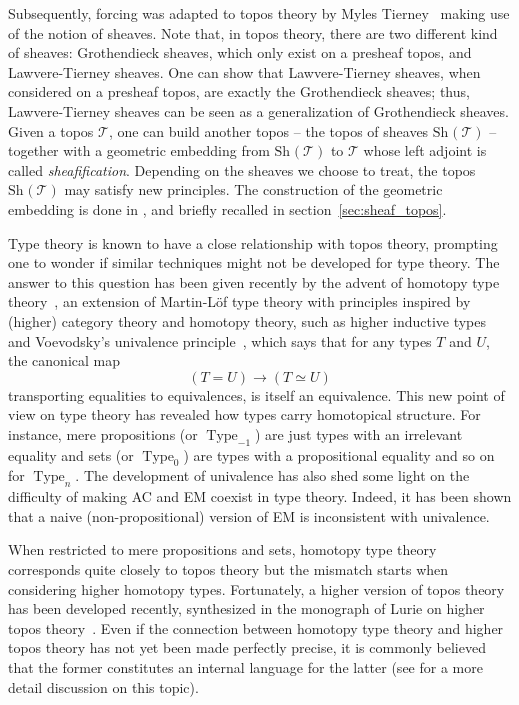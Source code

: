 \documentclass[notfinal]{jfrarticle}
\DeclareMathOperator{\Type}{Type}
\newcommand \Sh[1] {\mathrm{Sh}_{#1}}
\begin{document}
Subsequently, forcing was adapted to topos theory by Myles
Tierney~\cite{tierney1972} making use of the notion of sheaves.
Note that, in topos theory, there are two different kind of sheaves:
Grothendieck sheaves, which only exist on a presheaf topos, and
Lawvere-Tierney sheaves. One can show that Lawvere-Tierney sheaves,
when considered on a presheaf topos, are exactly the Grothendieck
sheaves; thus, Lawvere-Tierney sheaves can be seen as a generalization
of Grothendieck sheaves.  Given a topos $\mathcal T$, one can build
another topos -- the topos of sheaves $\Sh{}(\mathcal T)$ -- together
with a geometric embedding from $\Sh{}(\mathcal T)$ to $\mathcal T$
whose left adjoint is called {\em sheafification}.  Depending on the
sheaves we choose to treat, the topos $\Sh{}(\mathcal T)$ may satisfy new
principles. The construction of the geometric embedding is done in
\cite[Section V.3]{maclanemoerdijk}, and briefly recalled in
section~\ref{sec:sheaf_topos}.

Type theory is known to have a close relationship with topos theory,
prompting one to wonder if similar techniques might not be developed for
type theory.
%
The answer to this question has been given recently by the advent of
homotopy type theory~\cite{hottbook}, an extension of
Martin-Löf type theory with principles inspired by (higher) category
theory and homotopy theory, such as higher inductive
types~\cite{lumsdaine2013higher,hottbook} and
Voevodsky's univalence principle~\cite{kapulkin2012simplicial}, which
says that for any types $T$ and $U$, the canonical map 
$$
(T = U) \to (T \simeq U)
$$ 
%
transporting equalities to equivalences, is itself an equivalence.
%
This new point of view on type theory has revealed how types
carry homotopical structure. For instance, mere propositions (or
$\Type_{-1}$) are just types with an
irrelevant equality and sets (or $\Type_{0}$) are types
with a propositional equality and so on for $\Type_{n}$.
%
The development of univalence has also shed some light on the
difficulty of making AC and EM coexist in type theory. Indeed, it
has been shown that a naive (non-propositional) version of EM is
inconsistent with univalence.

When restricted to mere propositions and sets, homotopy type
theory corresponds quite closely to topos theory but the mismatch
starts when considering higher homotopy types.
%
Fortunately, a higher version of topos theory has been developed
recently, synthesized in the monograph of Lurie on
higher topos theory~\cite{lurie}. Even if the connection between 
homotopy type theory and higher topos theory has not yet been made
perfectly precise, it is commonly believed that the former constitutes an internal
language for the latter (see \cite{shulman2015} for a more detail
discussion on this topic). 
\end{document}
